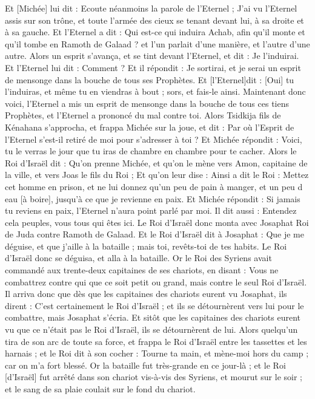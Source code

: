 \begin{multicols}{2}
Et [Michée] lui dit : Ecoute néanmoins la parole de l'Eternel ; J'ai vu l'Eternel assis sur son trône, et toute l'armée des cieux se tenant devant lui, à sa droite et à sa gauche.
Et l'Eternel a dit : Qui est-ce qui induira Achab, afin qu'il monte et qu'il tombe en Ramoth de Galaad ? et l'un parlait d'une manière, et l'autre d'une autre.
Alors un esprit s'avança, et se tint devant l'Eternel, et dit : Je l'induirai. Et l'Eternel lui dit : Comment ?
Et il répondit : Je sortirai, et je serai un esprit de mensonge dans la bouche de tous ses Prophètes. Et [l'Eternel]dit : [Oui] tu l'induiras, et même tu en viendras à bout ; sors, et fais-le ainsi.
Maintenant donc voici, l'Eternel a mis un esprit de mensonge dans la bouche de tous ces tiens Prophètes, et l'Eternel a prononcé du mal contre toi.
Alors Tsidkija fils de Kénahana s'approcha, et frappa Michée sur la joue, et dit : Par où l'Esprit de l'Eternel s'est-il retiré de moi pour s'adresser à toi ?
Et Michée répondit : Voici, tu le verras le jour que tu iras de chambre en chambre pour te cacher.
Alors le Roi d'Israël dit : Qu'on prenne Michée, et qu'on le mène vers Amon, capitaine de la ville, et vers Joas le fils du Roi ;
Et qu'on leur dise : Ainsi a dit le Roi : Mettez cet homme en prison, et ne lui donnez qu'un peu de pain à manger, et un peu d eau [à boire], jusqu'à ce que je revienne en paix.
Et Michée répondit : Si jamais tu reviens en paix, l'Eternel n'aura point parlé par moi. Il dit aussi : Entendez cela peuples, vous tous qui êtes ici.
Le Roi d'Israël donc monta avec Josaphat Roi de Juda contre Ramoth de Galaad.
Et le Roi d'Israël dit à Josaphat : Que je me déguise, et que j'aille à la bataille ; mais toi, revêts-toi de tes habits. Le Roi d'Israël donc se déguisa, et alla à la bataille.
Or le Roi des Syriens avait commandé aux trente-deux capitaines de ses chariots, en disant : Vous ne combattrez contre qui que ce soit petit ou grand, mais contre le seul Roi d'Israël.
Il arriva donc que dès que les capitaines des chariots eurent vu Josaphat, ils dirent : C'est certainement le Roi d'Israël ; et ils se détournèrent vers lui pour le combattre, mais Josaphat s'écria.
Et sitôt que les capitaines des chariots eurent vu que ce n'était pas le Roi d'Israël, ils se détournèrent de lui.
Alors quelqu'un tira de son arc de toute sa force, et frappa le Roi d'Israël entre les tassettes et les harnais ; et le Roi dit à son cocher : Tourne ta main, et mène-moi hors du camp ; car on m'a fort blessé.
Or la bataille fut très-grande en ce jour-là ; et le Roi [d'Israël] fut arrêté dans son chariot vis-à-vis des Syriens, et mourut sur le soir ; et le sang de sa plaie coulait sur le fond du chariot.

\end{multicols}
